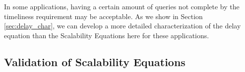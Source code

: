 In some applications, having a certain amount of queries not complete by the timeliness requirement may be acceptable.  As we show in Section \ref{sec:delay_char}, we can develop a more detailed characterization of the delay equation than the Scalability Equations here for these applications. 

\subsection{Validation of Scalability Equations}
\label{sec:validation}


